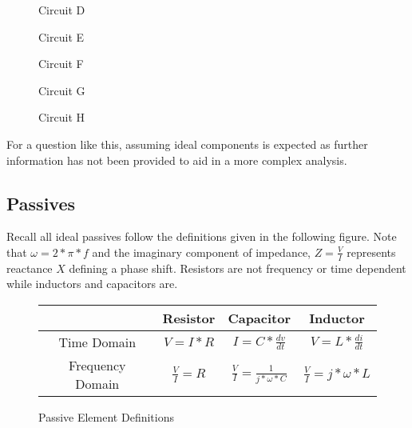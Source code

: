 \documentclass[main.tex]{subfiles}
\begin{document}
\begin{figure}[h!]
    \begin{center}
        \begin{circuitikz}[american]
            \label{fig:rc_high_pass_filter}
        \end{circuitikz}
        \caption{Circuit D}
    \end{center}
\end{figure}

\begin{figure}[h!]
    \caption{Circuit E}
    \label{fig:c_current_source}
\end{figure}

\begin{figure}[h!]
    \caption{Circuit F}
    \label{fig:rc_current_source}
\end{figure}

\begin{figure}[h!]
    \caption{Circuit G}
    \label{fig:rlc_series}
\end{figure}

\begin{figure}[h!]
    \caption{Circuit H}
    \label{fig:rlc_parallel}
\end{figure}

\spoilerline

\noindent For a question like this, assuming ideal components is expected as further information has not been provided to aid in a more complex analysis.

\subsection{Passives}
Recall all ideal passives follow the definitions given in the following figure. Note that $\omega = 2 * \pi * f$ and the imaginary component of impedance, $Z = \frac{V}{I}$ represents reactance $X$ defining a phase shift. Resistors are not frequency or time dependent while inductors and capacitors are. 
\begin{figure}[h!]
    \centering
    \begin{tabular}{|c|c|c|c|}
        \hline
         & Resistor & Capacitor & Inductor \\ \hline
        Time Domain & $V = I * R$ & $I = C * \frac{dv}{dt}$ & $V = L * \frac{di}{dt}$ \\ \hline
        Frequency Domain & $\frac{V}{I} = R$ & $\frac{V}{I} = \frac{1}{j*\omega*C}$ & $\frac{V}{I} = j*\omega*L$ \\ \hline
    \end{tabular}
    \caption{Passive Element Definitions}
    \label{fig:passive definitions}
\end{figure}
\end{document}
